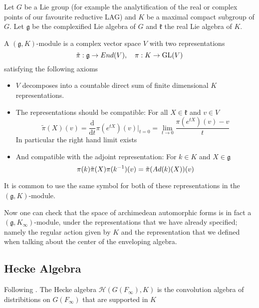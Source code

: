 \begin{definition}
    Let \(G\) be a Lie group (for example the analytification of the real or complex points of our favourite reductive LAG) and \(K\) be a maximal compact subgroup of \(G\). Let \(\mathfrak{g}\) be the complexified Lie algebra of \(G\) and \(\mathfrak{k}\) the real Lie algebra of \(K\). 
    
    A \((\mathfrak{g}, K)\)-module is a complex vector space \(V\) with two representations 
    \[\tilde{\pi}: \mathfrak{g} \to End(V), \quad \pi: K\to \operatorname{GL}(V)\]
    satisfying the following axioms
    \begin{itemize}
        \item \(V\) decomposes into a countable direct sum of finite dimensional \(K\) representations.
        \item The representations should be compatible: For all \(X \in \mathfrak{k}\) and \(v\in V\)
        \[\tilde{\pi}(X)(v) = \frac{\mathrm{d}}{\mathrm{d}t}\pi(e^{tX})(v)|_{t=0} = \lim_{t\to 0}\frac{\pi(e^{tX})(v) - v}{t}\]
        In particular the right hand limit exists
        \item And compatible with the adjoint representation: For \(k\in K\) and \(X\in \mathfrak{g}\) 
         \[\pi(k)\tilde{\pi}(X) \pi(k^{-1} )(v) = \tilde{\pi}(Ad(k)(X))(v)\]
    \end{itemize}
\end{definition}

\begin{remark}
    It is common to use the same symbol for both of these representations in the \((\mathfrak{g}, K)\)-module.
\end{remark}
Now one can check  that the space of archimedean automorphic forms is in fact a \((\mathfrak{g}, K_\infty)\)-module, under the representations that we have already specified; namely the regular action given by \(K\) and the representation that we defined when talking about the center of the enveloping algebra.

\subsection{Hecke Algebra}
Following \cite[I.II]{borelAutomorphicFormsRepresentations1979}. The Hecke algebra \(\mathcal{H}(G(F_\infty), K)\) is the convolution algebra of distribitions on \(G(F_\infty)\) that are supported in \(K\)

